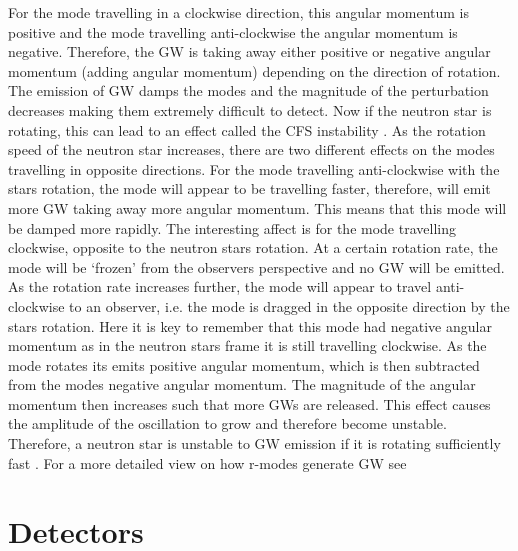 For the mode travelling in a clockwise direction, this angular momentum is positive and the mode travelling anti-clockwise the angular momentum is negative. 
Therefore, the \gls{GW} is taking away either positive or negative angular momentum (adding angular momentum) depending on the direction of rotation.
The emission of \gls{GW} damps the modes and the magnitude of the perturbation decreases making them extremely difficult to detect.
Now if the neutron star is rotating, this can lead to an effect called the \gls{CFS} instability  \citep{chandrasekhar1970SolutionsTwo,friedman1978SecularInstability}. 
As the rotation speed of the neutron star increases, there are two different effects on the modes travelling in opposite directions. 
For the mode travelling anti-clockwise with the stars rotation, the mode will appear to be travelling faster, therefore, will emit more \gls{GW} taking away more angular momentum. This means that this mode will be damped more rapidly.
The interesting affect is for the mode travelling clockwise, opposite to the neutron stars rotation. 
At a certain rotation rate, the mode will be `frozen' from the observers perspective and no \gls{GW} will be emitted.
As the rotation rate increases further, the mode will appear to travel anti-clockwise to an observer, i.e. the mode is dragged in the opposite direction by the stars rotation. 
Here it is key to remember that this mode had negative angular momentum as in the neutron stars frame it is still travelling clockwise.
As the mode rotates its emits positive angular momentum, which is then subtracted from the modes negative angular momentum.
The magnitude of the angular momentum then increases such that more \glspl{GW} are released.
This effect causes the amplitude of the oscillation to grow and therefore become unstable.
Therefore, a neutron star is unstable to \gls{GW} emission if it is rotating sufficiently fast \citep{lasky2015GravitationalWaves}.
For a more detailed view on how r-modes generate \gls{GW} see \citep{owen1998GravitationalWaves,jonesCFSInstability}


\section{\label{intro:detector}Detectors}

